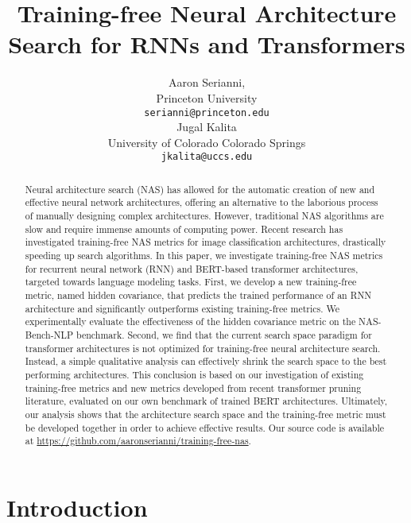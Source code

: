 \documentclass[11pt]{article}
\title{Training-free Neural Architecture Search for RNNs and Transformers}
\author{Aaron Serianni, \\
  Princeton University \\
  \texttt{serianni@princeton.edu} \\\And
  Jugal Kalita \\
  University of Colorado Colorado Springs \\
  \texttt{jkalita@uccs.edu} \\}
\begin{document}
\maketitle
\begin{abstract}
    Neural architecture search (NAS) has allowed for the automatic creation of new and effective neural network architectures, offering an alternative to the laborious process of manually designing complex architectures. However, traditional NAS algorithms are slow and require immense amounts of computing power. Recent research has investigated training-free NAS metrics for image classification architectures, drastically speeding up search algorithms. In this paper, we investigate training-free NAS metrics for recurrent neural network (RNN) and BERT-based transformer architectures, targeted towards language modeling tasks. First, we develop a new training-free metric, named hidden covariance, that predicts the trained performance of an RNN architecture and significantly outperforms existing training-free metrics. We experimentally evaluate the effectiveness of the hidden covariance metric on the NAS-Bench-NLP benchmark. Second, we find that the current search space paradigm for transformer architectures is not optimized for training-free neural architecture search. Instead, a simple qualitative analysis can effectively shrink the search space to the best performing architectures. This conclusion is based on our investigation of existing training-free metrics and new metrics developed from recent transformer pruning literature, evaluated on our own benchmark of trained BERT architectures. Ultimately, our analysis shows that the architecture search space and the training-free metric must be developed together in order to achieve effective results. Our source code is available at \url{https://github.com/aaronserianni/training-free-nas}.
\end{abstract}

\section{Introduction}
\end{document}
